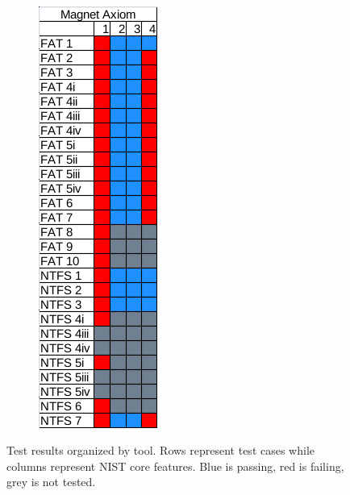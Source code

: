 \begin{figure}[h!]
\begin{subfigure}{0.3\linewidth}
    \end{subfigure}
    ~
    \begin{subfigure}{0.3\linewidth}
        \includegraphics[width=\linewidth]{fig/axiom_results.png}
    \end{subfigure}
        
    \caption{Test results organized by tool. Rows represent test cases while columns represent NIST core features. Blue is passing, red is failing, grey is not tested.}
    \label{fig:results}
\end{figure}

